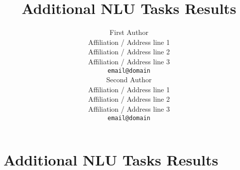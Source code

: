 \documentclass[11pt]{article}
\title{Additional NLU Tasks Results}
\author{First Author \\
  Affiliation / Address line 1 \\
  Affiliation / Address line 2 \\
  Affiliation / Address line 3 \\
  \texttt{email@domain} \\\And
  Second Author \\
  Affiliation / Address line 1 \\
  Affiliation / Address line 2 \\
  Affiliation / Address line 3 \\
  \texttt{email@domain} \\}
\begin{document}
\maketitle
\section{Additional NLU Tasks Results}





\end{document}
